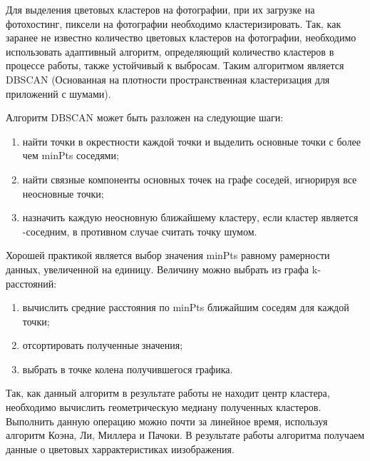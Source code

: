 Для выделения цветовых кластеров на фотографии, при их загрузке на фотохостинг, пиксели на фотографии необходимо кластеризировать.
Так, как заранее не известно количество цветовых кластеров на фотографии, необходимо использовать адаптивный алгоритм, определяющий количество кластеров в процессе работы, также устойчивый к выбросам.
Таким алгоритмом является DBSCAN (Основанная на плотности пространственная кластеризация для приложений с шумами).

Алгоритм DBSCAN может быть разложен на следующие шаги:
\begin{enumerate}
    \item найти точки в \varepsilon окрестности каждой точки и выделить основные точки с более чем minPts соседями;
    \item найти связные компоненты основных точек на графе соседей, игнорируя все неосновные точки;
    \item назначить каждую неосновную ближайшему кластеру, если кластер является \varepsilon -соседним, в противном случае считать точку шумом.
\end{enumerate}

Хорошей практикой является выбор значения minPts равному рамерности данных, увеличенной на единицу.
Величину \epsilon можно выбрать из графа k-расстояний:
\begin{enumerate}
    \item вычислить средние расстояния по minPts ближайшим соседям для каждой точки;
    \item отсортировать полученные значения;
    \item выбрать \epsilon в точке колена получившегося графика.
\end{enumerate}

Так, как данный алгоритм в результате работы не находит центр кластера, необходимо вычислить геометрическую медиану полученных кластеров.
Выполнить данную операцию можно почти за линейное время, используя алгоритм Коэна, Ли, Миллера и Пачоки.
В результате работы алгоритма получаем данные о цветовых харрактеристиках иизображения.

\clearpage